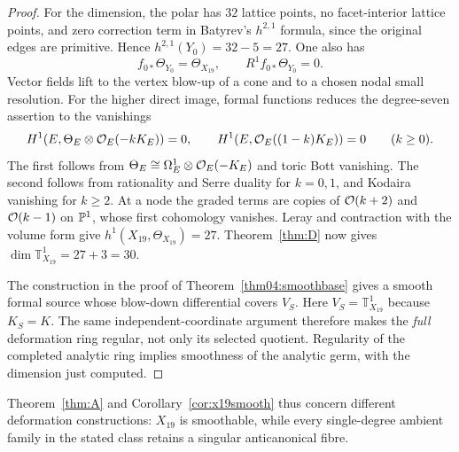 \begin{proof}
For the dimension, the polar has $32$ lattice points, no
facet-interior lattice points, and zero correction term in Batyrev's
$h^{2,1}$ formula, since the original edges are primitive.  Hence
$h^{2,1}(Y_0)=32-5=27$.  One also has
\[
 f_{0*}\Theta_{Y_0}=\Theta_{X_{19}},\qquad
 R^1f_{0*}\Theta_{Y_0}=0.
\]
Vector fields lift to the vertex blow-up of a cone and to a chosen
nodal small resolution.  For the higher direct image, formal
functions reduces the degree-seven assertion to the vanishings
\[
 H^1(E,\Theta_E\otimes\mathcal{O}_E(-kK_E))=0,\qquad
 H^1(E,\mathcal{O}_E((1-k)K_E))=0\qquad(k\ge0).
\]
The first follows from
$\Theta_E\cong\Omega^1_E\otimes\mathcal{O}_E(-K_E)$ and toric Bott
vanishing.  The second follows from rationality and Serre duality
for $k=0,1$, and Kodaira vanishing for $k\ge2$.  At a node the
graded terms are copies of $\mathcal{O}(k+2)$ and $\mathcal{O}(k-1)$ on $\mathbb{P}^1$,
whose first cohomology vanishes.  Leray and contraction with the
volume form give $h^1(X_{19},\Theta_{X_{19}})=27$.
Theorem~\ref{thm:D} now gives $\dim\mathbb T^1_{X_{19}}=27+3=30$.

The construction in the proof of Theorem~\ref{thm04:smoothbase}
gives a smooth formal source whose blow-down differential covers
$V_S$.  Here $V_S=\mathbb T^1_{X_{19}}$ because $K_S=K$.
The same independent-coordinate argument therefore makes the
\emph{full} deformation ring regular, not only its selected
quotient.  Regularity of the completed analytic ring implies
smoothness of the analytic germ, with the dimension just computed.
\end{proof}

Theorem~\ref{thm:A} and Corollary~\ref{cor:x19smooth} thus concern
different deformation constructions: $X_{19}$ is smoothable, while
every single-degree ambient family in the stated class retains a
singular anticanonical fibre.
